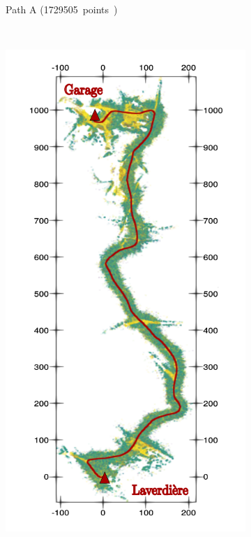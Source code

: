 \begin{figure}[h!]
\begin{center}
\begin{subfigure}[b]{0.32\textwidth}
			\label{fig:ltr_a}
			\caption{Path A (\SI{1729505} points)}
		\end{subfigure}%
		~
		\begin{subfigure}[b]{0.32\textwidth}
			\includegraphics[width=\linewidth]{figs/ltr_map_traj/path_b.pdf}

\end{subfigure}
\end{center}
\end{figure}
